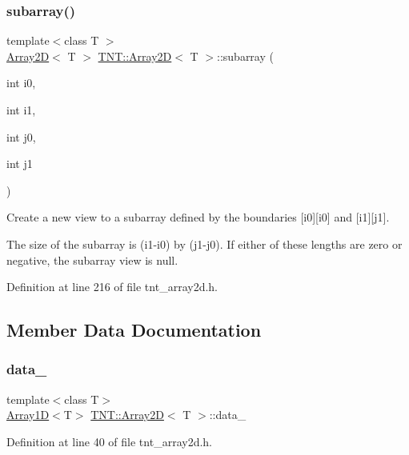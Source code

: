 \subsubsection{\texorpdfstring{subarray()}{subarray()}}
{\footnotesize\ttfamily template$<$class T $>$ \\
\hyperlink{classTNT_1_1Array2D}{Array2D}$<$ T $>$ \hyperlink{classTNT_1_1Array2D}{T\+N\+T\+::\+Array2D}$<$ T $>$\+::subarray (\begin{DoxyParamCaption}\item[{int}]{i0,  }\item[{int}]{i1,  }\item[{int}]{j0,  }\item[{int}]{j1 }\end{DoxyParamCaption})}



Create a new view to a subarray defined by the boundaries \mbox{[}i0\mbox{]}\mbox{[}i0\mbox{]} and \mbox{[}i1\mbox{]}\mbox{[}j1\mbox{]}. 

The size of the subarray is (i1-\/i0) by (j1-\/j0). If either of these lengths are zero or negative, the subarray view is null. 

Definition at line 216 of file tnt\+\_\+array2d.\+h.



\subsection{Member Data Documentation}
\mbox{\label{classTNT_1_1Array2D_afb5d79a6c51d8d27121a982aaff4bc47}} 
\subsubsection{\texorpdfstring{data\+\_\+}{data\_}}
{\footnotesize\ttfamily template$<$class T$>$ \\
\hyperlink{classTNT_1_1Array1D}{Array1D}$<$T$>$ \hyperlink{classTNT_1_1Array2D}{T\+N\+T\+::\+Array2D}$<$ T $>$\+::data\+\_\+\hspace{0.3cm}{\ttfamily [private]}}



Definition at line 40 of file tnt\+\_\+array2d.\+h.

\mbox{\label{classTNT_1_1Array2D_ad866fbd5cb16df751ebf9e4eea6f2f22}} 
